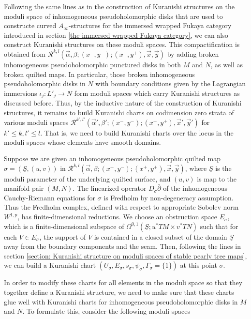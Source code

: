 \documentclass{amsart}
\numberwithin{equation}{section}
\numberwithin{figure}{section}
\begin{document}
	Following the same lines as in the construction of Kuranishi structures on the moduli space of inhomogeneous pseudoholomorphic disks that are used to constructe curved $A_{\infty}$-structures for the immersed wrapped Fukaya category introduced in section \ref{the immersed wrapped Fukaya category}, we can also construct Kuranishi structures on these moduli spaces. This compactification is obtained from $\mathcal{R}^{k, l}(\vec{\alpha}, \beta; (x^{-}, y^{-}); (x^{+}, y^{+}), \vec{x}, \vec{y})$ by adding broken inhomogeneous pseudoholomorphic punctured disks in both $M$ and $N$, as well as broken quilted maps. In particular, those broken inhomogeneous pseudoholomorphic disks in $N$ with boundary conditions given by the Lagrangian immersions $\iota_{j}: L'_{j} \to N$ form moduli spaces which carry Kuranishi structures as discussed before. Thus, by the inductive nature of the construction of Kuranishi structures, it remains to build Kuranishi charts on codimension zero strata of various moduli spaces $\mathcal{R}^{k', l'}(\vec{\alpha}', \beta'; (x^{-}, y^{-}); (x^{+}, y^{+}), \vec{x}', \vec{y}')$ for $k' \le k, l' \le l$. That is, we need to build Kuranishi charts over the locus in the moduli spaces whose elements have smooth domains. \par
	Suppose we are given an inhomogeneous pseudoholomorphic quilted map $\sigma = (\underline{S}, (u, v))$ in $\mathcal{R}^{k, l}(\vec{\alpha}, \beta; (x^{-}, y^{-}); (x^{+}, y^{+}), \vec{x}, \vec{y})$, where $\underline{S}$ is the moduli parameter of the underlying quilted surface, and $(u, v)$ is map to the manifold pair $(M, N)$. The linearized operator $D_{\sigma}\bar{\partial}$ of the inhomogeneous Cauchy-Riemann equations for $\sigma$ is Fredholm by non-degeneracy assumption. Thus the Fredholm complex, defined with respect to appropriate Sobolev norm $W^{1, p}$, has finite-dimensional reductions. We choose an obstruction space $E_{\sigma}$, which is a finite-dimensional subspace of $\Omega^{0, 1}(\underline{S}; u^{*}TM \times v^{*}TN)$ such that for each $V \in E_{\sigma}$, the support of $V$ is contained in a closed subset of the domain $\underline{S}$ away from the boundary components and the seam. Then, following the lines in section \ref{section: Kuranishi structure on moduli spaces of stable pearly tree maps}, we can build a Kuranishi chart $(U_{\sigma}, E_{\sigma}, s_{\sigma}, \psi_{\sigma}, \Gamma_{\sigma} = \{1\})$ at this point $\sigma$. \par
	In order to modify these charts for all elements in the moduli space so that they together define a Kuranishi structure, we need to make sure that these charts glue well with Kuranishi charts for inhomogeneous pseudoholomorphic disks in $M$ and $N$. To formulate this, consider the following moduli spaces
\end{document}
